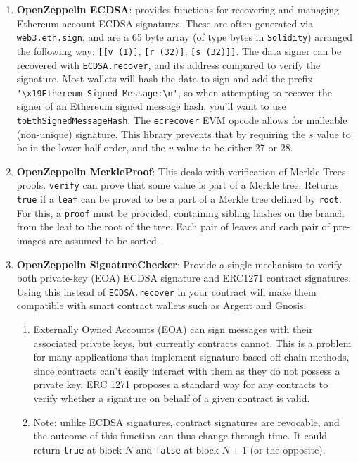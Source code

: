 \begin{enumerate}
\item\textbf{OpenZeppelin ECDSA}: provides functions for recovering and managing Ethereum account ECDSA signatures. These are often generated via \verb|web3.eth.sign|, and are a 65 byte array (of type bytes in \verb|Solidity|) arranged the following way: \verb|[[v (1)]|, \verb|[r (32)]|, \verb|[s (32)]]|. The data signer can be recovered with \verb|ECDSA.recover|, and its address compared to verify the signature. Most wallets will hash the data to sign and add the prefix \verb|'\x19Ethereum Signed Message:\n'|, so when attempting to recover the signer of an Ethereum signed message hash, you’ll want to use \verb|toEthSignedMessageHash|. The \verb|ecrecover| EVM opcode allows for malleable (non-unique) signature. This library prevents that by requiring the $s$ value to be in the lower half order, and the $v$ value to be either 27 or 28.

\item\textbf{OpenZeppelin MerkleProof}: This deals with verification of Merkle Trees proofs. \verb|verify| can prove that some value is part of a Merkle tree. Returns \verb|true| if a \verb|leaf| can be proved to be a part of a Merkle tree defined by \verb|root|. For this, a \verb|proof| must be provided, containing sibling hashes on the branch from the leaf to the root of the tree. Each pair of leaves and each pair of pre-images are assumed to be sorted.

\item\textbf{OpenZeppelin SignatureChecker}: Provide a single mechanism to verify both private-key (EOA) ECDSA signature and ERC1271 contract signatures. Using this instead of \verb|ECDSA.recover| in your contract will make them compatible with smart contract wallets such as Argent and Gnosis.
	\begin{enumerate}
	\item Externally Owned Accounts (EOA) can sign messages with their associated private keys, but currently contracts cannot. This is a problem for many applications that implement signature based off-chain methods, since contracts can't easily interact with them as they do not possess a private key. ERC 1271 proposes a standard way for any contracts to verify whether a signature on behalf of a given contract is valid.
	\item Note: unlike ECDSA signatures, contract signatures are revocable, and the outcome of this function can thus change through time. It could return \verb|true| at block $N$ and \verb|false| at block $N+1$ (or the opposite).
	\end{enumerate}


\end{enumerate}
